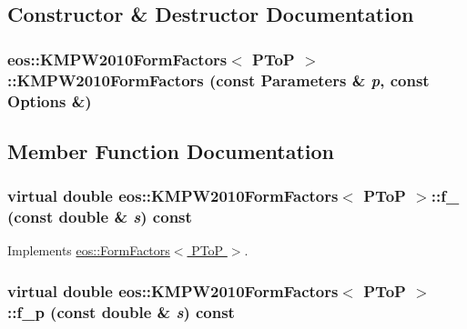 \subsection{Constructor \& Destructor Documentation}
\hypertarget{classeos_1_1KMPW2010FormFactors_3_01PToP_01_4_a78a3560c2eb5879191d2d65e40a0bfa7}{
\subsubsection[{KMPW2010FormFactors}]{\setlength{\rightskip}{0pt plus 5cm}eos::KMPW2010FormFactors$<$ {\bf PToP} $>$::KMPW2010FormFactors (const {\bf Parameters} \& {\em p}, \/  const {\bf Options} \&)}}
\label{classeos_1_1KMPW2010FormFactors_3_01PToP_01_4_a78a3560c2eb5879191d2d65e40a0bfa7}


\subsection{Member Function Documentation}
\hypertarget{classeos_1_1KMPW2010FormFactors_3_01PToP_01_4_a7dc4ed06627cac344e437df9760f135f}{
\subsubsection[{f\_\-0}]{\setlength{\rightskip}{0pt plus 5cm}virtual double eos::KMPW2010FormFactors$<$ {\bf PToP} $>$::f\_ (const double \& {\em s}) const}}
\label{classeos_1_1KMPW2010FormFactors_3_01PToP_01_4_a7dc4ed06627cac344e437df9760f135f}


Implements \hyperlink{classeos_1_1FormFactors_3_01PToP_01_4_a097a12cde6acb9004d1a92cbb8e60734}{eos::FormFactors$<$ PToP $>$}.\hypertarget{classeos_1_1KMPW2010FormFactors_3_01PToP_01_4_ab0d16ba2b523915c8f6169bb8783ffd0}{
\subsubsection[{f\_\-p}]{\setlength{\rightskip}{0pt plus 5cm}virtual double eos::KMPW2010FormFactors$<$ {\bf PToP} $>$::f\_\-p (const double \& {\em s}) const}}
\label{classeos_1_1KMPW2010FormFactors_3_01PToP_01_4_ab0d16ba2b523915c8f6169bb8783ffd0}


